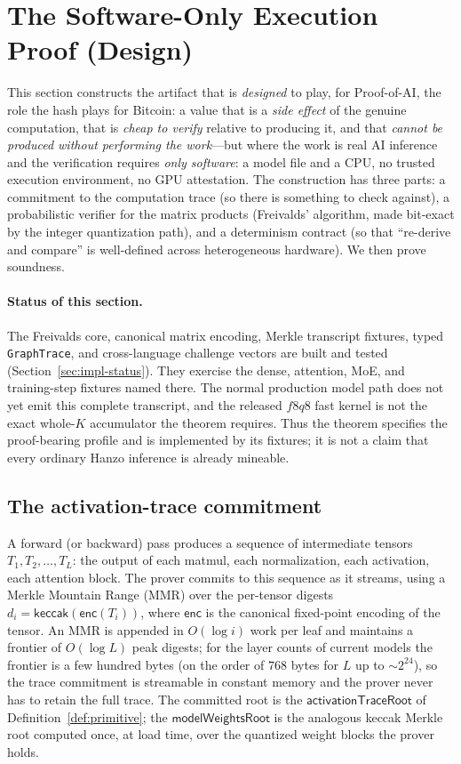 \section{The Software-Only Execution Proof (Design)}
\label{sec:freivalds}

This section constructs the artifact that is \emph{designed} to play, for Proof-of-AI,
the role the hash
plays for Bitcoin: a value that is a \emph{side effect} of the genuine computation,
that is \emph{cheap to verify} relative to producing it, and that \emph{cannot be
produced without performing the work}---but where the work is real AI inference and
the verification requires \emph{only software}: a model file and a CPU, no trusted
execution environment, no GPU attestation. The construction has three parts: a
commitment to the computation trace (so there is something to check against), a
probabilistic verifier for the matrix products (Freivalds' algorithm, made
bit-exact by the integer quantization path), and a determinism contract (so that
``re-derive and compare'' is well-defined across heterogeneous hardware). We then
prove soundness.

\paragraph{Status of this section.} The Freivalds core, canonical matrix encoding,
Merkle transcript fixtures, typed \texttt{GraphTrace}, and cross-language challenge
vectors are built and tested (Section~\ref{sec:impl-status}). They exercise the dense,
attention, MoE, and training-step fixtures named there. The normal production model path
does not yet emit this complete transcript, and the released $f8q8$ fast kernel is not the
exact whole-$K$ accumulator the theorem requires. Thus the theorem specifies the
proof-bearing profile and is implemented by its fixtures; it is not a claim that every
ordinary Hanzo inference is already mineable.

\subsection{The activation-trace commitment}
\label{sec:mmr}

A forward (or backward) pass produces a sequence of intermediate tensors
$T_1, T_2, \ldots, T_L$: the output of each matmul, each normalization, each
activation, each attention block. The prover commits to this sequence as it streams,
using a Merkle Mountain Range (MMR) over the per-tensor digests
$d_i = \mathsf{keccak}(\mathsf{enc}(T_i))$, where $\mathsf{enc}$ is the canonical
fixed-point encoding of the tensor. An MMR is appended in $O(\log i)$ work per leaf
and maintains a frontier of $O(\log L)$ peak digests; for the layer counts of
current models the frontier is a few hundred bytes (on the order of $768$ bytes for
$L$ up to $\sim 2^{24}$), so the trace commitment is streamable in constant memory
and the prover never has to retain the full trace. The committed root is the
$\mathsf{activationTraceRoot}$ of Definition~\ref{def:primitive}; the
$\mathsf{modelWeightsRoot}$ is the analogous keccak Merkle root computed once, at
load time, over the quantized weight blocks the prover holds.

